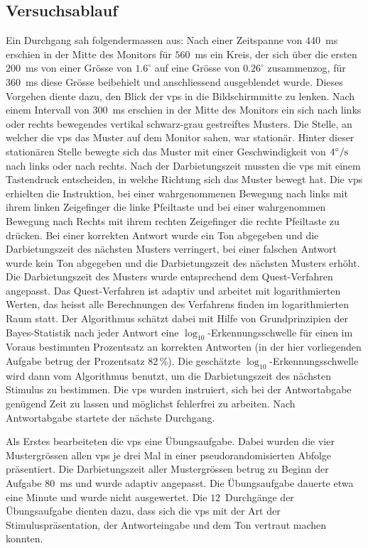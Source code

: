 \documentclass[11pt, twoside, a4paper]{book}		%
\begin{document}
\subsection{Versuchsablauf \label{subsec:Spatial-Suppression_Versuchsablauf}}

Ein Durchgang sah folgendermassen aus: Nach einer Zeitspanne von $440$~ms erschien in der Mitte des Monitors für $560$~ms ein Kreis, der sich über die ersten $200$~ms von einer Grösse von $1.6^{\circ}$ auf eine Grösse von $0.26^{\circ}$ zusammenzog, für $360$~ms diese Grösse beibehielt und anschliessend ausgeblendet wurde. Dieses Vorgehen diente dazu, den Blick der \glspl{vp} in die Bildschirmmitte zu lenken. Nach einem  Intervall von $300$~ms erschien in der Mitte des Monitors ein sich nach links oder rechts bewegendes vertikal schwarz-grau gestreiftes Musters. Die Stelle, an welcher die \glspl{vp} das Muster auf dem Monitor sahen, war stationär. Hinter dieser stationären Stelle bewegte sich das Muster mit einer Geschwindigkeit von $4^\circ / \textnormal{s} $  nach links oder nach rechts. Nach der Darbietungszeit mussten die \glspl{vp} mit einem Tastendruck entscheiden, in welche Richtung sich das Muster bewegt hat. Die \glspl{vp} erhielten die Instruktion, bei einer wahrgenommenen Bewegung nach links mit ihrem linken Zeigefinger die linke Pfeiltaste  und bei einer wahrgenommen Bewegung nach Rechts mit ihrem rechten Zeigefinger die rechte Pfeiltaste zu drücken. 
Bei einer korrekten Antwort wurde ein Ton abgegeben und die Darbietungszeit des nächsten Musters verringert, bei einer falschen Antwort wurde kein Ton abgegeben und die Darbietungszeit des nächsten Musters erhöht. 
Die Darbietungszeit des Musters wurde entsprechend dem Quest-Verfahren \citep{Watson1983} angepasst.
Das Quest-Verfahren ist adaptiv und arbeitet mit logarithmierten Werten, das heisst alle Berechnungen des Verfahrens finden im logarithmierten Raum statt. Der Algorithmus schätzt dabei mit Hilfe von Grundprinzipien der Bayes-Statistik nach jeder Antwort eine $\log_{10}$-Erkennungsschwelle für einen im Voraus bestimmten Prozentsatz an korrekten Antworten (in der hier vorliegenden Aufgabe betrug der Prozentsatz $82\,\%$).
Die geschätzte $\log_{10}$-Erkennungsschwelle wird dann vom Algorithmus benutzt, um die Darbietungszeit des nächsten Stimulus zu bestimmen. 
Die \glspl{vp} wurden instruiert, sich bei der Antwortabgabe genügend Zeit zu lassen und möglichst fehlerfrei zu arbeiten. Nach Antwortabgabe startete der nächste Durchgang.

Als Erstes bearbeiteten die \glspl{vp} eine Übungsaufgabe. Dabei wurden die vier Mustergrössen allen \glspl{vp} je drei Mal in einer pseudorandomisierten Abfolge präsentiert. Die Darbietungszeit aller Mustergrössen betrug zu Beginn der Aufgabe $80$~ms und wurde adaptiv angepasst. Die Übungsaufgabe dauerte etwa eine Minute und wurde nicht ausgewertet. Die $12$~Durchgänge der Übungsaufgabe dienten dazu, dass sich die \glspl{vp} mit der Art der Stimuluspräsentation, der Antworteingabe und dem Ton vertraut machen konnten. 
\end{document}
